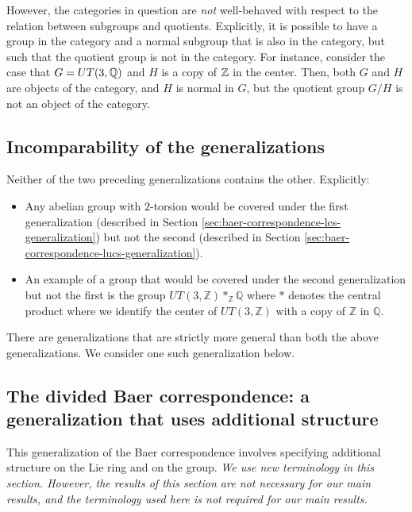 However, the categories in question are {\em not} well-behaved with
respect to the relation between subgroups and quotients. Explicitly,
it is possible to have a group in the category and a normal subgroup
that is also in the category, but such that the quotient group is not
in the category. For instance, consider the case that $G = UT(3,\mathbb{Q})$
and $H$ is a copy of $\mathbb{Z}$ in the center. Then, both $G$ and $H$ are
objects of the category, and $H$ is normal in $G$, but the quotient
group $G/H$ is not an object of the category.

\subsection{Incomparability of the generalizations}

Neither of the two preceding generalizations contains the other. Explicitly:

\begin{itemize}
\item Any abelian group with $2$-torsion would be covered under the
  first generalization (described in Section
  \ref{sec:baer-correspondence-lcs-generalization}) but not the second
  (described in Section
  \ref{sec:baer-correspondence-lucs-generalization}).
\item An example of a group that would be covered under the second
  generalization but not the first is the group $UT(3,\mathbb{Z})
  *_{\mathbb{Z}} \mathbb{Q}$ where $*$ denotes the central product where
  we identify the center of $UT(3,\mathbb{Z})$ with a copy of
  $\mathbb{Z}$ in $\mathbb{Q}$.
\end{itemize}

There are generalizations that are strictly more general than both the
above generalizations. We consider one such generalization below.

\subsection{The divided Baer correspondence: a generalization that uses additional structure}\label{sec:divided-baer-correspondence}

This generalization of the Baer correspondence involves specifying
additional structure on the Lie ring and on the group. {\em We use new
  terminology in this section. However, the results of this section
  are not necessary for our main results, and the terminology used
  here is not required for our main results.}

